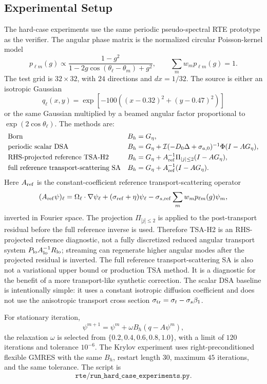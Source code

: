 \documentclass[11pt]{article}
\begin{document}
\subsection{Experimental Setup}

The hard-case experiments use the same periodic pseudo-spectral RTE prototype
as the verifier. The angular phase matrix is the normalized circular
Poisson-kernel model
\[
  p_{\ell m}(g)
  \propto
  \frac{1-g^2}{1-2g\cos(\theta_\ell-\theta_m)+g^2},
  \qquad
  \sum_m w_m p_{\ell m}(g)=1 .
\]
The test grid is \(32\times32\), with \(24\) directions and \(dx=1/32\).
The source is either an isotropic Gaussian
\[
  q_\ell(x,y)=\exp[-100((x-0.32)^2+(y-0.47)^2)]
\]
or the same Gaussian multiplied by a beamed angular factor proportional to
\(\exp(2\cos\theta_\ell)\). The methods are:
\[
\begin{array}{ll}
\text{Born} & B_h=G_\eta,\\[1mm]
\text{periodic scalar DSA} &
  B_h=G_\eta+\mathcal I(-D_0\Delta+\sigma_{a,0})^{-1}
  \Phi(I-AG_\eta),\\[1mm]
\text{RHS-projected reference TSA-H2} &
  B_h=G_\eta+A_{\rm ref}^{-1}\Pi_{|j|\le2}(I-AG_\eta),\\[1mm]
\text{full reference transport-scattering SA} &
  B_h=G_\eta+A_{\rm ref}^{-1}(I-AG_\eta).
\end{array}
\]
Here \(A_{\rm ref}\) is the constant-coefficient reference
transport-scattering operator
\[
  (A_{\rm ref}\psi)_\ell
  =
  \Omega_\ell\cdot\nabla\psi_\ell
  +(\sigma_{\rm ref}+\eta)\psi_\ell
  -\sigma_{s,\rm ref}\sum_m w_m p_{\ell m}(g)\psi_m ,
\]
inverted in Fourier space.  The projection \(\Pi_{|j|\le2}\) is applied to the
post-transport residual before the full reference inverse is used.  Therefore
TSA-H2 is an RHS-projected reference diagnostic, not a fully discretized
reduced angular transport system \(P_{\rm lo}A_{\rm lo}^{-1}R_{\rm lo}\);
streaming can regenerate higher angular modes after the projected residual is
inverted.  The full reference transport-scattering SA is also not a variational
upper bound or production TSA method. It is a diagnostic for the benefit of a
more transport-like synthetic correction. The scalar DSA baseline is
intentionally simple: it uses a constant isotropic diffusion coefficient and
does not use the anisotropic transport cross section
\(\sigma_{\rm tr}=\sigma_t-\sigma_s\beta_1\).

For stationary iteration,
\[
  \psi^{m+1}=\psi^m+\omega B_h(q-A\psi^m),
\]
the relaxation \(\omega\) is selected from
\(\{0.2,0.4,0.6,0.8,1.0\}\), with a limit of \(120\) iterations and tolerance
\(10^{-6}\).  The Krylov experiment uses right-preconditioned flexible GMRES
with the same \(B_h\), restart length \(30\), maximum \(45\) iterations, and
the same tolerance.  The script is
\[
  \texttt{rte/run\_hard\_case\_experiments.py}.
\]
\end{document}
